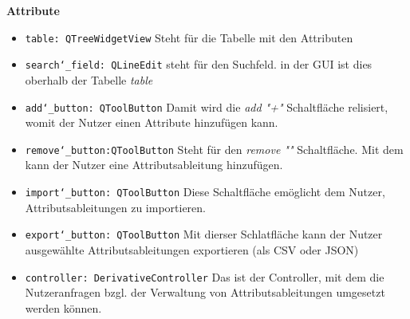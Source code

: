 \documentclass{article}
\begin{document}
\textbf{{Attribute}}
\begin{itemize}
\item \texttt{table: QTreeWidgetView} \newline Steht für die Tabelle mit den Attributen
\item \texttt{search\char`_field: QLineEdit} \newline steht für den Suchfeld. in der GUI ist dies oberhalb der Tabelle \textit{table}
\item \texttt{add\char`_button: QToolButton} \newline Damit wird die \textit{add "+"} Schaltfläche relisiert, womit der Nutzer einen Attribute hinzufügen kann.
\item \texttt{remove\char`_button:QToolButton} \newline Steht für den \textit{remove "\textendash"} Schaltfläche. Mit dem kann der Nutzer eine Attributsableitung hinzufügen. 
\item \texttt{import\char`_button: QToolButton} \newline Diese Schaltfläche emöglicht dem Nutzer, Attributsableitungen zu importieren.
\item \texttt{export\char`_button: QToolButton} \newline Mit dierser Schlatfläche kann der Nutzer ausgewählte Attributsableitungen exportieren (als CSV oder JSON)
\item \texttt{controller: DerivativeController} \newline Das ist der Controller, mit dem die Nutzeranfragen bzgl. der Verwaltung von Attributsableitungen umgesetzt werden können.
\end{itemize}
\end{document}
